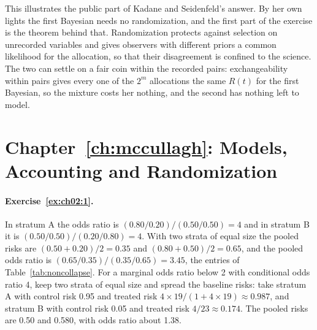 This illustrates the public part of Kadane and Seidenfeld's answer. By her own lights the first Bayesian needs no randomization, and the first part of the exercise is the theorem behind that. Randomization protects against selection on unrecorded variables and gives observers with different priors a common likelihood for the allocation, so that their disagreement is confined to the science. The two can settle on a fair coin within the recorded pairs: exchangeability within pairs gives every one of the $2^m$ allocations the same $R(t)$ for the first Bayesian, so the mixture costs her nothing, and the second has nothing left to model.

\section*{Chapter~\ref{ch:mccullagh}: Models, Accounting and Randomization}

\paragraph{Exercise~\ref{ex:ch02:1}.} In stratum A the odds ratio is $(0.80/0.20)/(0.50/0.50) = 4$ and in stratum B it is $(0.50/0.50)/(0.20/0.80) = 4$. With two strata of equal size the pooled risks are $(0.50 + 0.20)/2 = 0.35$ and $(0.80 + 0.50)/2 = 0.65$, and the pooled odds ratio is $(0.65/0.35)/(0.35/0.65) = 3.45$, the entries of Table~\ref{tab:noncollapse}. For a marginal odds ratio below 2 with conditional odds ratio 4, keep two strata of equal size and spread the baseline risks: take stratum A with control risk 0.95 and treated risk $4 \times 19/(1 + 4 \times 19) \approx 0.987$, and stratum B with control risk 0.05 and treated risk $4/23 \approx 0.174$. The pooled risks are 0.50 and 0.580, with odds ratio about 1.38.

